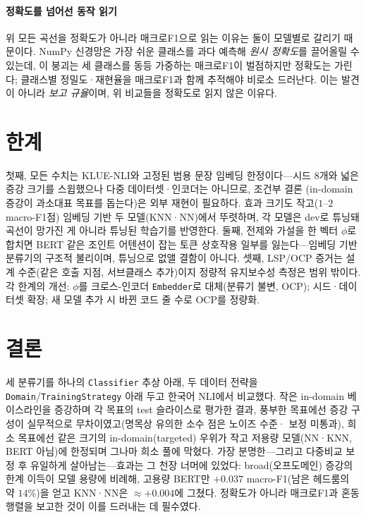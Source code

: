 \documentclass[conference]{IEEEtran}
\begin{document}
\paragraph*{정확도를 넘어선 동작 읽기}
위 모든 곡선을 정확도가 아니라 매크로F1으로 읽는 이유는 둘이 모델별로 갈리기
때문이다. NumPy 신경망은 가장 쉬운 클래스를 과다 예측해 \emph{원시 정확도}를
끌어올릴 수 있는데, 이 붕괴는 세 클래스를 동등 가중하는 매크로F1이 벌점하지만
정확도는 가린다; 클래스별 정밀도·재현율을 매크로F1과 함께 추적해야 비로소 드러난다.
이는 발견이 아니라 \emph{보고 규율}이며, 위 비교들을 정확도로 읽지 않은 이유다.

\section{한계}
\label{sec:limits}
첫째, 모든 수치는 KLUE-NLI와 고정된 범용 문장 임베딩 한정이다---시드 $8$개와
넓은 증강 크기를 스윕했으나 다중 데이터셋·인코더는 아니므로, 조건부 결론
(in-domain 증강이 과소대표 목표를 돕는다)은 외부 재현이 필요하다. 효과 크기도
작고($1$--$2$ macro-F1점) 임베딩 기반 두 모델(KNN·NN)에서 뚜렷하며, 각 모델은 dev로 튜닝돼 곡선이
망가진 게 아니라 튜닝된 학습기를 반영한다. 둘째, 전제와 가설을 한 벡터 $\phi$로 합치면 BERT 같은 조인트 어텐션이
잡는 토큰 상호작용 일부를 잃는다---임베딩 기반 분류기의 구조적 불리이며, 튜닝으로
없앨 결함이 아니다. 셋째, LSP/OCP 증거는 설계 수준(같은 호출 지점, 서브클래스
추가)이지 정량적 유지보수성 측정은 범위 밖이다. 각 한계의 개선: $\phi$를
크로스-인코더 \texttt{Embedder}로 대체(분류기 불변, OCP); 시드·데이터셋 확장; 새
모델 추가 시 바뀐 코드 줄 수로 OCP를 정량화.

\section{결론}
\label{sec:conclusion}
세 분류기를 하나의 \texttt{Classifier} 추상 아래, 두 데이터 전략을
\texttt{Domain}/\texttt{TrainingStrategy} 아래 두고 한국어 NLI에서 비교했다. 작은
in-domain 베이스라인을 증강하며 각 목표의 test 슬라이스로 평가한 결과, 풍부한
목표에선 증강 구성이 실무적으로 무차이였고(명목상 유의한 소수 점은 노이즈 수준·
보정 미통과), 희소 목표에선 같은 크기의 in-domain(targeted) 우위가 작고 저용량
모델(NN·KNN, BERT 아님)에 한정되며 그나마 희소 풀에 막혔다. 가장 분명한---그리고
다중비교 보정 후 유일하게 살아남는---효과는 그 천장 너머에 있었다: broad(오프도메인)
증강의 한계 이득이 모델 용량에 비례해, 고용량 BERT만 $+0.037$ macro-F1(남은 헤드룸의
약 $14\%$)을 얻고 KNN·NN은 $\approx +0.004$에 그쳤다. 정확도가 아니라
매크로F1과 혼동행렬을 보고한 것이 이를 드러내는 데 필수였다.
\end{document}
